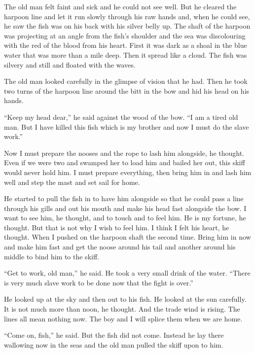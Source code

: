 \documentclass[fontset=ubuntu,zihao=-4]{ctexrep}
\begin{document}
The old man felt faint and sick and he could not see well. But he cleared
the harpoon line and let it run slowly through his raw hands and, when he
could see, he saw the fish was on his back with his silver belly up. The
shaft of the harpoon was projecting at an angle from the fish's shoulder and
the sea was \gls{discolouring} with the red of the blood from his heart.
First it was dark as a \gls{shoal} in the blue water that was more than a
mile deep. Then it spread like a cloud. The fish was silvery and still and
floated with the \glspl{wave}.

The old man looked carefully in the \gls{glimpse} of \gls{vision} that he
had. Then he took two turns of the harpoon line around the bitt in the bow
and \gls{hid} his head on his hands.

``Keep my head dear,'' he said against the wood of the bow. ``I am a tired
old man. But I have killed this fish which is my brother and now I must do
the slave work.''

Now I must prepare the \glspl{noose} and the rope to lash him alongside, he
thought. Even if we were two and \gls{swamped} her to load him and \gls{bailed}
her out, this skiff would never hold him. I must prepare everything, then
bring him in and lash him well and step the mast and set sail for home.

He started to pull the fish in to have him alongside so that he could pass a
line through his gills and out his mouth and make his head fast alongside
the bow. I want to see him, he thought, and to touch and to feel him. He is
my \gls{fortune}, he thought. But that is not why I wish to feel him. I think I
felt his heart, he thought. When I pushed on the harpoon shaft the second
time. Bring him in now and make him fast and get the noose around his tail
and another around his middle to bind him to the skiff.

``Get to work, old man,'' he said. He took a very small drink of the water.
``There is very much slave work to be done now that the fight is over.''

He looked up at the sky and then out to his fish. He looked at the sun
carefully. It is not much more than noon, he thought. And the trade wind is
rising. The lines all mean nothing now. The boy and I will \gls{splice} them
when we are home.

``Come on, fish,'' he said. But the fish did not come. Instead he lay there
\gls{wallowing} now in the seas and the old man pulled the skiff \gls{upon} to
him.
\end{document}
